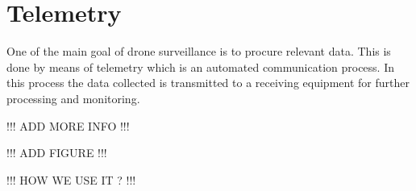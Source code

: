 \section{Telemetry}
One of the main goal of drone surveillance is to procure relevant data. This is done by means of telemetry which is an automated communication process. In this process the data collected is transmitted to a receiving equipment for further processing and monitoring. 

!!! ADD MORE INFO !!!

!!! ADD FIGURE !!!

!!! HOW WE USE IT ? !!!